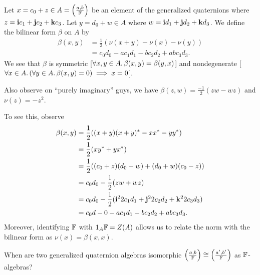 
\lecture{}

\begin{definition}
Let $x=c_{0}+z\in A=\left(\frac{a,b}{\mathbb{F}}\right)$ be an element of the
generalized quaternions where $z=\mathbf{i}c_{1}+\mathbf{j}c_{2}+\mathbf{k}c_{3}$.
Let $y=d_{0}+w\in A$ where $w=\mathbf{i}d_{1}+\mathbf{j}d_{2}+\mathbf{k}d_{3}$.
We define the bilinear form $\beta$ on $A$ by
\begin{equation}
\begin{split}
\beta(x,y) &= \frac{1}{2}(\nu(x+y)-\nu(x)-\nu(y))\\
&=c_{0}d_{0}-ac_{1}d_{1}-bc_{2}d_{2}+abc_{3}d_{3}.
\end{split}
\end{equation}
We see that $\beta$ is symmetric [$\forall x,y\in A\ldotp\beta(x,y)=\beta(y,x)$] and
nondegenerate [$\forall x\in A\ldotp(\forall y\in A\ldotp\beta(x,y)=0)\implies x=0$].

Also observe on ``purely imaginary'' guys, we have $\beta(z,w)=\frac{-1}{2}(zw-wz)$ and $\nu(z)=-z^{2}$.
\end{definition}

\begin{note}
To see this, observe
\begin{subequations}
  \begin{align}
\beta(x,y) &= \frac{1}{2}((x+y)(x+y)^{*}-xx^{*}-yy^{*})\\
&=\frac{1}{2}(xy^{*}+yx^{*})\\
&=\frac{1}{2}((c_{0}+z)(d_{0}-w)+(d_{0}+w)(c_{0}-z))\\
&=c_{0}d_{0}-\frac{1}{2}(zw+wz)\\
&=c_{0}d_{0}-\frac{1}{2}(\mathbf{i}^{2}2c_{1}d_{1}+\mathbf{j}^{2}2c_{2}d_{2}+\mathbf{k}^{2}2c_{3}d_{3})\\
&=c_{0}d-{0}-ac_{1}d_{1}-bc_{2}d_{2}+abc_{3}d_{3}.
  \end{align}
\end{subequations}
Moreover, identifying $\mathbb{F}$ with $1_{A}\mathbb{F}=Z(A)$ allows us to relate
the norm with the bilinear form as $\nu(x)=\beta(x,x)$.
\end{note}

\begin{puzzle}
When are two generalized quaternion algebras isomorphic
$\left(\frac{a,b}{\mathbb{F}}\right)\cong\left(\frac{a',b'}{\mathbb{F}}\right)$ as $\mathbb{F}$-algebras?
\end{puzzle}

